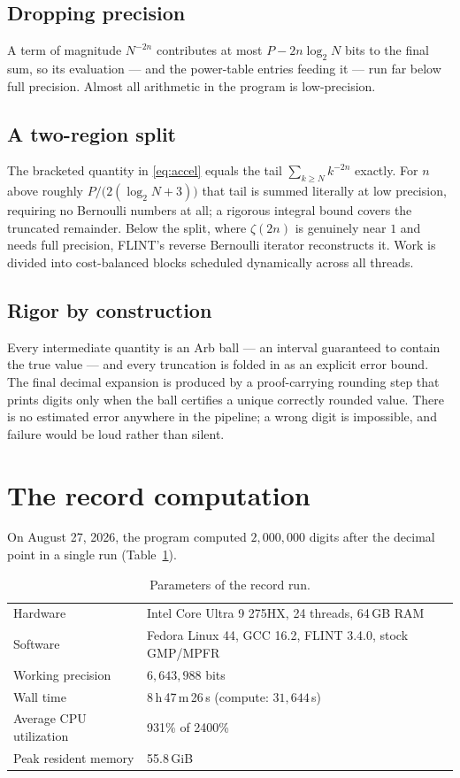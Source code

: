 \documentclass[11pt]{amsart}
\begin{document}
\subsection*{Dropping precision}
A term of magnitude $N^{-2n}$ contributes at most
$P - 2n \log_2 N$ bits to the final sum, so its evaluation --- and the
power-table entries feeding it --- run far below full precision.
Almost all arithmetic in the program is low-precision.

\subsection*{A two-region split}
The bracketed quantity in \eqref{eq:accel} equals the tail
$\sum_{k \ge N} k^{-2n}$ exactly. For $n$ above roughly
$P / \bigl(2(\log_2 N + 3)\bigr)$ that tail is summed literally at low
precision, requiring no Bernoulli numbers at all; a rigorous integral
bound covers the truncated remainder. Below the split, where
$\zeta(2n)$ is genuinely near $1$ and needs full precision, FLINT's
reverse Bernoulli iterator reconstructs it. Work is divided into
cost-balanced blocks scheduled dynamically across all threads.

\subsection*{Rigor by construction}
Every intermediate quantity is an Arb ball --- an interval guaranteed
to contain the true value --- and every truncation is folded in as an
explicit error bound. The final decimal expansion is produced by a
proof-carrying rounding step that prints digits only when the ball
certifies a unique correctly rounded value. There is no estimated
error anywhere in the pipeline; a wrong digit is impossible, and
failure would be loud rather than silent.

\section{The record computation}

On August 27, 2026, the program computed $2{,}000{,}000$ digits after
the decimal point in a single run (Table~\ref{tab:run}).

\begin{table}[ht]
\caption{Parameters of the record run.}
\label{tab:run}
\begin{tabular}{ll}
\toprule
Hardware & Intel Core Ultra 9 275HX, 24 threads, 64\,GB RAM \\
Software & Fedora Linux 44, GCC 16.2, FLINT 3.4.0, stock GMP/MPFR \\
Working precision & $6{,}643{,}988$ bits \\
Wall time & 8\,h\,47\,m\,26\,s \quad (compute: $31{,}644$\,s) \\
Average CPU utilization & 931\% of 2400\% \\
Peak resident memory & 55.8\,GiB \\
\bottomrule
\end{tabular}
\end{table}
\end{document}
